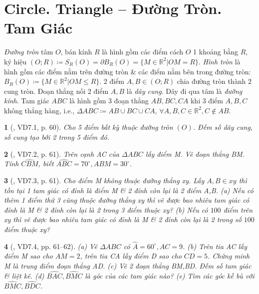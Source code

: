 \documentclass{article}
\newtheorem{baitoan}{}
\begin{document}
\section{Circle. Triangle -- Đường Tròn. Tam Giác}
 \textit{Đường tròn} tâm $O$, bán kính $R$ là hình gồm các điểm cách $O$ 1 khoảng bằng $R$, ký hiệu $(O;R)\coloneqq S_R(O) = \partial B_R(O) = \{M\in\mathbb{R}^2|OM = R\}$.  \textit{Hình tròn} là hình gồm các điểm nằm trên đường tròn \& các điểm nằm bên trong đường tròn: $B_R(O)\coloneqq\{M\in\mathbb{R}^2|OM\le R\}$.  2 điểm $A,B\in(O;R)$ chia đường tròn thành 2 cung tròn. Đoạn thẳng nối 2 điểm $A,B$ là \textit{dây cung}. Dây đi qua tâm là \textit{đường kính}.  Tam giác $ABC$ là hình gồm 3 đoạn thẳng $AB,BC,CA$ khi 3 điểm $A,B,C$ không thẳng hàng, i.e., $\Delta ABC\coloneqq AB\cup BC\cup CA$, $\forall A,B,C\in\mathbb{R}^2,C\notin AB$.

\begin{baitoan}[\cite{TLCT_THCS_Toan_6_hinh_hoc}, VD7.1, p. 60]
	Cho 5 điểm bất kỳ thuộc đường tròn $(O)$. Đếm số dây cung, số cung tạo bởi 2 trong 5 điểm đó.
\end{baitoan}

\begin{baitoan}[\cite{TLCT_THCS_Toan_6_hinh_hoc}, VD7.2, p. 61]
	Trên cạnh AC của $\Delta ABC$ lấy điểm M. Vẽ đoạn thẳng BM. Tính $\widehat{CBM}$, biết $\widehat{ABC} = 70^\circ,\widehat{ABM} = 30^\circ$.
\end{baitoan}

\begin{baitoan}[\cite{TLCT_THCS_Toan_6_hinh_hoc}, VD7.3, p. 61]
	Cho điểm M không thuộc đường thẳng xy. Lấy $A,B\in xy$ thì tồn tại 1 tam giác có đỉnh là điểm M \& 2 đỉnh còn lại là 2 điểm A,B. (a) Nếu có thêm 1 điểm thứ 3 cũng thuộc đường thẳng xy thì vẽ được bao nhiêu tam giác có đỉnh là M \& 2 đỉnh còn lại là 2 trong 3 điểm thuộc xy? (b) Nếu có $100$ điểm trên xy thì vẽ được bao nhiêu tam giác có đỉnh là M \& 2 đỉnh còn lại là 2 trong số $100$ điểm thuộc xy?
\end{baitoan}

\begin{baitoan}[\cite{TLCT_THCS_Toan_6_hinh_hoc}, VD7.4, pp. 61--62]
	(a) Vẽ $\Delta ABC$ có $\widehat{A} = 60^\circ,AC = 9$. (b) Trên tia AC lấy điểm M sao cho $AM = 2$, trên tia CA lấy điểm D sao cho $CD = 5$. Chứng minh M là trung điểm đoạn thẳng AD. (c) Vẽ 2 đoạn thẳng BM,BD. Đếm số tam giác \& liệt kê. (d) $\widehat{BAC},\widehat{BMC}$ là góc của các tam giác nào? (e) Tìm các góc kề bù với $\widehat{BMC},\widehat{BDC}$.
\end{baitoan}
\end{document}
